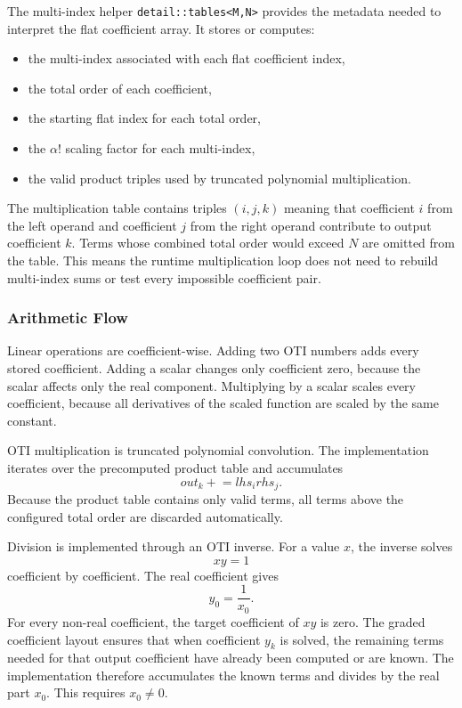 \documentclass[11pt]{article}
\begin{document}
The multi-index helper \texttt{detail::tables<M,N>} provides the metadata
needed to interpret the flat coefficient array. It stores or computes:

\begin{itemize}[noitemsep]
    \item the multi-index associated with each flat coefficient index,
    \item the total order of each coefficient,
    \item the starting flat index for each total order,
    \item the \(\alpha!\) scaling factor for each multi-index,
    \item the valid product triples used by truncated polynomial
    multiplication.
\end{itemize}

The multiplication table contains triples \((i,j,k)\) meaning that coefficient
\(i\) from the left operand and coefficient \(j\) from the right operand
contribute to output coefficient \(k\). Terms whose combined total order would
exceed \(N\) are omitted from the table. This means the runtime multiplication
loop does not need to rebuild multi-index sums or test every impossible
coefficient pair.

\subsubsection{Arithmetic Flow}

Linear operations are coefficient-wise. Adding two OTI numbers adds every
stored coefficient. Adding a scalar changes only coefficient zero, because the
scalar affects only the real component. Multiplying by a scalar scales every
coefficient, because all derivatives of the scaled function are scaled by the
same constant.

OTI multiplication is truncated polynomial convolution. The implementation
iterates over the precomputed product table and accumulates
\[
    out_k \mathrel{+}= lhs_i rhs_j.
\]
Because the product table contains only valid terms, all terms above the
configured total order are discarded automatically.

Division is implemented through an OTI inverse. For a value \(x\), the inverse
solves
\[
    x y = 1
\]
coefficient by coefficient. The real coefficient gives
\[
    y_0 = \frac{1}{x_0}.
\]
For every non-real coefficient, the target coefficient of \(xy\) is zero. The
graded coefficient layout ensures that when coefficient \(y_k\) is solved, the
remaining terms needed for that output coefficient have already been computed
or are known. The implementation therefore accumulates the known terms and
divides by the real part \(x_0\). This requires \(x_0 \neq 0\).
\end{document}
